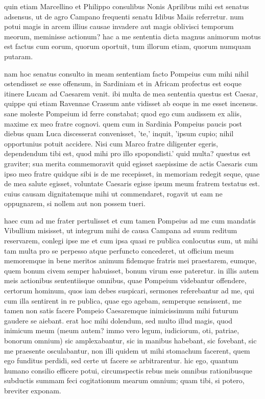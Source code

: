  quin etiam Marcellino et Philippo consulibus Nonis Aprilibus mihi est senatus adsensus, ut de agro Campano frequenti senatu Idibus Maiis referretur. num potui magis in arcem illius causae invadere aut magis oblivisci temporum meorum, meminisse actionum? hac a me sententia dicta magnus animorum motus est factus cum eorum, quorum oportuit, tum illorum etiam, quorum numquam putaram.

 nam hoc senatus consulto in meam sententiam facto Pompeius cum mihi nihil ostendisset se esse offensum, in Sardiniam et in Africam profectus est eoque itinere Lucam ad Caesarem venit. ibi multa de mea sententia questus est Caesar, quippe qui etiam Ravennae Crassum ante vidisset ab eoque in me esset incensus. sane moleste Pompeium id ferre constabat; quod ego cum audissem ex aliis, maxime ex meo fratre cognovi. quem cum in Sardinia Pompeius paucis post diebus quam Luca discesserat convenisset, 'te,' inquit, 'ipsum cupio; nihil opportunius potuit accidere. Nisi cum Marco fratre diligenter egeris, dependendum tibi est, quod mihi pro illo spopondisti.' quid multa? questus est graviter; sua merita commemoravit quid egisset saepissime de actis Caesaris cum ipso meo fratre quidque sibi is de me recepisset, in memoriam redegit seque, quae de mea salute egisset, voluntate Caesaris egisse ipsum meum fratrem testatus est. cuius causam dignitatemque mihi ut commendaret, rogavit ut eam ne oppugnarem, si nollem aut non possem tueri.

 haec cum ad me frater pertulisset et cum tamen Pompeius ad me cum mandatis Vibullium misisset, ut integrum mihi de causa Campana ad suum reditum reservarem, conlegi ipse me et cum ipsa quasi re publica conlocutus sum, ut mihi tam multa pro se perpesso atque perfuncto concederet, ut officium meum memoremque in bene meritos animum fidemque fratris mei praestarem, eumque, quem bonum civem semper habuisset, bonum virum esse pateretur. in illis autem meis actionibus sententiisque omnibus, quae Pompeium videbantur offendere, certorum hominum, quos iam debes suspicari, sermones referebantur ad me, qui cum illa sentirent in re publica, quae ego agebam, semperque sensissent, me tamen non satis facere Pompeio Caesaremque inimicissimum mihi futurum gaudere se aiebant. erat hoc mihi dolendum, sed multo illud magis, quod inimicum meum (meum autem? immo vero legum, iudiciorum, oti, patriae, bonorum omnium) sic amplexabantur, sic in manibus habebant, sic fovebant, sic me praesente osculabantur, non illi quidem ut mihi stomachum facerent, quem ego funditus perdidi, sed certe ut facere se arbitrarentur. hic ego, quantum humano consilio efficere potui, circumspectis rebus meis omnibus rationibusque subductis summam feci cogitationum mearum omnium; quam tibi, si potero, breviter exponam.

